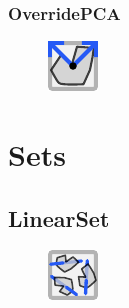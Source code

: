 \documentclass{ol-softwaremanual}
\begin{document}
\subsubsection{OverridePCA}
\begin{figure}[h]
    \centering
    \includegraphics[width = .5\textwidth]{figures/Icons/OVERRIDEPCA.pdf}
\end{figure}

\section{Sets}

\subsection{LinearSet}
\begin{figure}[h]
    \centering
    \includegraphics[width = .5\textwidth]{figures/Icons/LINEARSET.pdf}
\end{figure}
\end{document}
